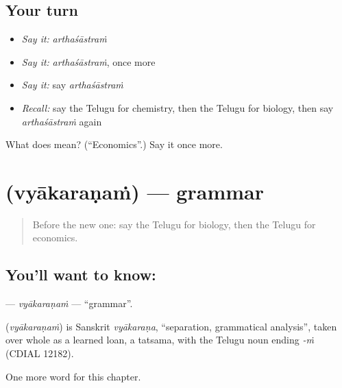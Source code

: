 \subsection*{Your turn}
\begin{itemize}
\raggedright
  \item \emph{Say it:} \emph{arthaśāstraṁ}
  \item \emph{Say it:} \emph{arthaśāstraṁ}, once more
  \item \emph{Say it:} say \emph{arthaśāstraṁ}
  \item \emph{Recall:} say the Telugu for chemistry, then the Telugu for biology, then say \emph{arthaśāstraṁ} again
\end{itemize}

\begin{tcolorbox}[breakable,colback=teal!4,colframe=teal!35!black,title={Before you move on}]
What does  mean? (\textquotedblleft{}Economics\textquotedblright{}.) Say it once more.
\end{tcolorbox}
\section[\texorpdfstring{\te{వ్యాకరణం} (vyākaraṇaṁ)}{వ్యాకరణం (vyākaraṇaṁ)}]{ (vyākaraṇaṁ) — grammar}

\label{lesson:TE-C276-vyakaranam}



\begin{quote}
Before the new one: say the Telugu for biology, then the Telugu for economics.
\end{quote}

\subsection*{You'll want to know: }
\textbf{} — \emph{vyākaraṇaṁ} — \textquotedblleft{}grammar\textquotedblright{}.

\begin{cousinweb}
\textbf{} (\emph{vyākaraṇaṁ}) is Sanskrit \emph{vyākaraṇa}, \textquotedblleft{}separation, grammatical analysis\textquotedblright{}, taken over whole as a learned loan, a tatsama, with the Telugu noun ending \emph{-ṁ} (CDIAL 12182).
\end{cousinweb}

\begin{grammarlens}[title={What you've built}]
One more word for this chapter.
\end{grammarlens}

